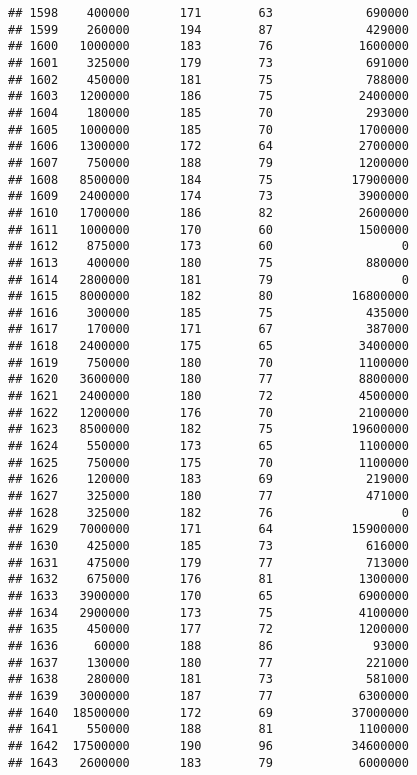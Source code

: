\documentclass[
]{article}
\begin{document}
\begin{verbatim}
## 1598    400000       171        63             690000
## 1599    260000       194        87             429000
## 1600   1000000       183        76            1600000
## 1601    325000       179        73             691000
## 1602    450000       181        75             788000
## 1603   1200000       186        75            2400000
## 1604    180000       185        70             293000
## 1605   1000000       185        70            1700000
## 1606   1300000       172        64            2700000
## 1607    750000       188        79            1200000
## 1608   8500000       184        75           17900000
## 1609   2400000       174        73            3900000
## 1610   1700000       186        82            2600000
## 1611   1000000       170        60            1500000
## 1612    875000       173        60                  0
## 1613    400000       180        75             880000
## 1614   2800000       181        79                  0
## 1615   8000000       182        80           16800000
## 1616    300000       185        75             435000
## 1617    170000       171        67             387000
## 1618   2400000       175        65            3400000
## 1619    750000       180        70            1100000
## 1620   3600000       180        77            8800000
## 1621   2400000       180        72            4500000
## 1622   1200000       176        70            2100000
## 1623   8500000       182        75           19600000
## 1624    550000       173        65            1100000
## 1625    750000       175        70            1100000
## 1626    120000       183        69             219000
## 1627    325000       180        77             471000
## 1628    325000       182        76                  0
## 1629   7000000       171        64           15900000
## 1630    425000       185        73             616000
## 1631    475000       179        77             713000
## 1632    675000       176        81            1300000
## 1633   3900000       170        65            6900000
## 1634   2900000       173        75            4100000
## 1635    450000       177        72            1200000
## 1636     60000       188        86              93000
## 1637    130000       180        77             221000
## 1638    280000       181        73             581000
## 1639   3000000       187        77            6300000
## 1640  18500000       172        69           37000000
## 1641    550000       188        81            1100000
## 1642  17500000       190        96           34600000
## 1643   2600000       183        79            6000000

\end{verbatim}
\end{document}
